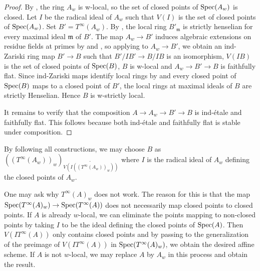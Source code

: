 \begin{proof}
    By , the ring $A_w$ is w-local, so the set of closed points
    of $\mathrm{Spec}(A_w)$ is closed.
    Let $I$ be the radical ideal of $A_w$ such that $V(I)$ is the set of closed points of $\mathrm{Spec}(A_w)$.
    Set $B' = T^{\infty}(A_w)$.
    By , the local ring $B'_{\mathfrak{m}}$ is
    strictly henselian for every maximal ideal $\mathfrak{m}$ of $B'$.
    The map $A_w \to B'$ induces algebraic extensions on residue fields at primes by
     and ,
    so applying  to $A_w \to B'$, we obtain
    an ind-Zariski ring map $B' \to B$ such that $B'/IB' \to B/IB$ is an isomorphism,
    $V(IB)$ is the set of closed points of $\mathrm{Spec}(B)$, $B$ is w-local
    and $A_w \to B' \to B$ is faithfully flat. Since ind-Zariski maps identify
    local rings by  and every closed point of
    $\mathrm{Spec}(B)$ maps to a closed point of $B'$,
    the local rings at maximal ideals of $B$ are strictly Henselian. Hence $B$ is w-strictly local.

    It remains to verify that the composition $A \to A_w \to B' \to B$ is ind-étale and faithfully flat.
    This follows because both ind-étale and faithfully flat is stable under composition.
\end{proof}

\begin{remark}
    By following all constructions, we may choose $B$
    as $((T^{\infty}(A_w))_w)_{\widetilde{V(I ((T^{\infty}(A_w))_w))}}$
    where $I$ is the radical ideal of $A_w$ defining the closed points of $A_w$.

    One may ask why $T^\infty(A)_w$ does not work. The reason for this is
    that the map $\mathrm{Spec}(T^{\infty}(A)_w) \to \mathrm{Spec}(T^{\infty}(A))$ does not necessarily
    map closed points to closed points. If $A$ is already $w$-local,
    we can eliminate the points mapping to non-closed points by taking $I$ to be the ideal defining
    the closed points of $\mathrm{Spec}(A)$.
    Then $V(I T^{\infty}(A))$ only contains closed points and by
    passing to the generalization of the preimage of $V(I T^{\infty}(A))$ in
    $\mathrm{Spec}(T^{\infty}(A)_w)$, we obtain the desired affine scheme. If $A$ is not $w$-local,
    we may replace $A$ by $A_w$ in this process and obtain the result.
\end{remark}

